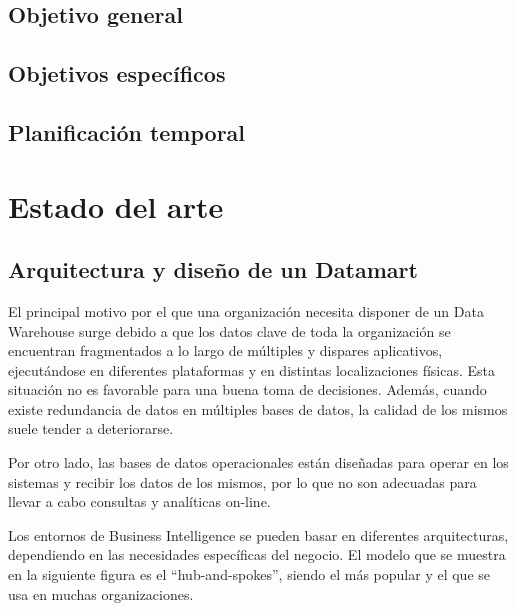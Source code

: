 \documentclass[a4paper, 12pt]{book}
\begin{document}
\section{Objetivo general}
\label{sec:objetivo-general}


\section{Objetivos específicos}
\label{sec:objetivos-especificos}


\section{Planificación temporal}
\label{sec:planificacion-temporal}




\cleardoublepage
\chapter{Estado del arte}

\section{Arquitectura y diseño de un Datamart} 
\label{sec:datamart}
El principal motivo por el que una organización necesita disponer de un Data Warehouse surge debido a que los datos clave de toda la organización se encuentran fragmentados a lo largo de múltiples y dispares aplicativos, ejecutándose en diferentes plataformas y en distintas localizaciones físicas. Esta situación no es favorable para una buena toma de decisiones. Además, cuando existe redundancia de datos en múltiples bases de datos, la calidad de los mismos suele tender a deteriorarse.

Por otro lado, las bases de datos operacionales están diseñadas para operar en los sistemas y recibir los datos de los mismos, por lo que no son adecuadas para llevar a cabo consultas y analíticas on-line.

Los entornos de Business Intelligence se pueden basar en diferentes arquitecturas, dependiendo en las necesidades específicas del negocio. El modelo que se muestra en la siguiente figura es el “hub-and-spokes”, siendo el más popular y el que se usa en muchas organizaciones.
\end{document}
